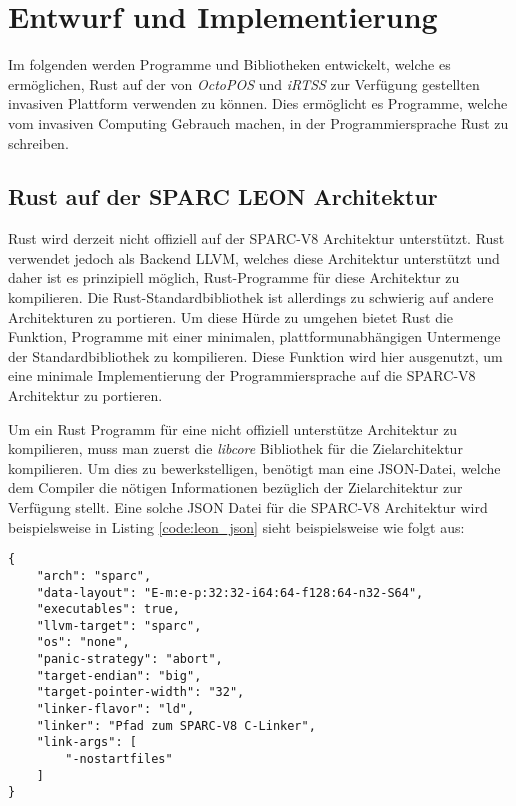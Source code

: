 \chapter{Entwurf und Implementierung}\label{sec:impl}

Im folgenden werden Programme und Bibliotheken entwickelt, welche es ermöglichen, Rust auf der von
\textit{OctoPOS} und \textit{iRTSS} zur Verfügung gestellten invasiven Plattform verwenden zu können.
Dies ermöglicht es Programme, welche vom invasiven Computing Gebrauch machen, in der
Programmiersprache Rust zu schreiben.

\section{Rust auf der SPARC LEON Architektur}\label{sec:rust_on_sparc}

Rust wird derzeit nicht offiziell auf der SPARC-V8 Architektur unterstützt. Rust verwendet jedoch als Backend LLVM,
welches diese Architektur unterstützt und daher ist es prinzipiell möglich,
Rust-Programme für diese Architektur zu kompilieren.
Die Rust-Standardbibliothek ist allerdings zu schwierig auf andere Architekturen zu portieren.
Um diese Hürde zu umgehen bietet Rust die Funktion,
Programme mit einer minimalen, plattformunabhängigen Untermenge der Standardbibliothek zu kompilieren.
Diese Funktion wird hier ausgenutzt,
um eine minimale Implementierung der Programmiersprache auf die SPARC-V8 Architektur zu portieren.

Um ein Rust Programm für eine nicht offiziell unterstütze Architektur zu kompilieren,
muss man zuerst die \textit{libcore} Bibliothek
für die Zielarchitektur kompilieren. Um dies zu bewerkstelligen, benötigt man eine JSON-Datei, welche
dem Compiler die nötigen Informationen bezüglich der Zielarchitektur zur Verfügung stellt.
Eine solche JSON Datei für die
SPARC-V8 Architektur wird beispielsweise in Listing \ref{code:leon_json}  sieht beispielsweise wie folgt aus\cite{initialSparcSupportGithub}:

\begin{lstlisting}[float,caption={
Eine beispielhafte JSON-Spezifikationsdatei für die SPARC-V8 Architektur.
\cite{initialSparcSupportGithub}
},label=code:leon_json]
{
    "arch": "sparc",
    "data-layout": "E-m:e-p:32:32-i64:64-f128:64-n32-S64",
    "executables": true,
    "llvm-target": "sparc",
    "os": "none",
    "panic-strategy": "abort",
    "target-endian": "big",
    "target-pointer-width": "32",
    "linker-flavor": "ld",
    "linker": "Pfad zum SPARC-V8 C-Linker",
    "link-args": [
        "-nostartfiles"
    ]
}
\end{lstlisting}


